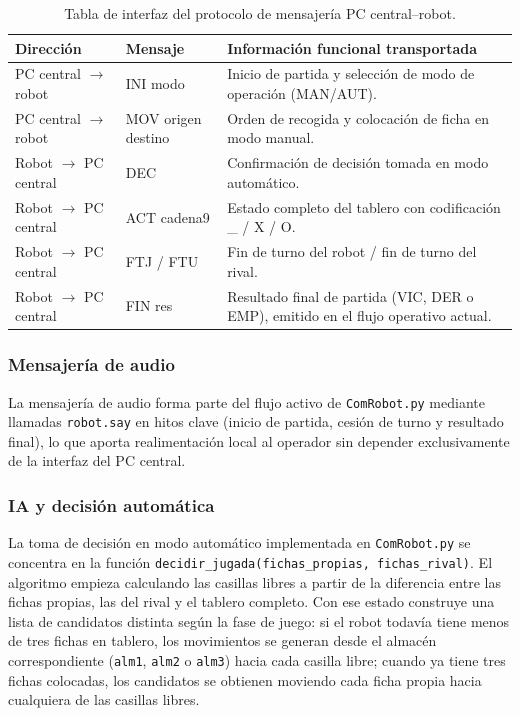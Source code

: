 \documentclass[12pt,a4paper]{article}
\begin{document}
\begin{table}[H]
\centering
\footnotesize
\begin{tabular}{P{0.15\textwidth} P{0.21\textwidth} P{0.56\textwidth}}
\toprule
\textbf{Dirección} & \textbf{Mensaje} & \textbf{Información funcional transportada} \\
\midrule
PC central $\rightarrow$ robot & INI modo & Inicio de partida y selección de modo de operación (MAN/AUT). \\
PC central $\rightarrow$ robot & MOV origen destino & Orden de recogida y colocación de ficha en modo manual. \\
Robot $\rightarrow$ PC central & DEC & Confirmación de decisión tomada en modo automático. \\
Robot $\rightarrow$ PC central & ACT cadena9 & Estado completo del tablero con codificación \_ / X / O. \\
Robot $\rightarrow$ PC central & FTJ / FTU & Fin de turno del robot / fin de turno del rival. \\
Robot $\rightarrow$ PC central & FIN res & Resultado final de partida (VIC, DER o EMP), emitido en el flujo operativo actual. \\
\bottomrule
\end{tabular}
\caption{Tabla de interfaz del protocolo de mensajería PC central--robot.}
\end{table}

\subsubsection{Mensajería de audio}
La mensajería de audio forma parte del flujo activo de \texttt{ComRobot.py} mediante llamadas \texttt{robot.say} en hitos clave (inicio de partida, cesión de turno y resultado final), lo que aporta realimentación local al operador sin depender exclusivamente de la interfaz del PC central.

\subsubsection{IA y decisión automática}
La toma de decisión en modo automático implementada en \texttt{ComRobot.py} se concentra en la función \texttt{decidir\_jugada(fichas\_propias, fichas\_rival)}. El algoritmo empieza calculando las casillas libres a partir de la diferencia entre las fichas propias, las del rival y el tablero completo. Con ese estado construye una lista de candidatos distinta según la fase de juego: si el robot todavía tiene menos de tres fichas en tablero, los movimientos se generan desde el almacén correspondiente (\texttt{alm1}, \texttt{alm2} o \texttt{alm3}) hacia cada casilla libre; cuando ya tiene tres fichas colocadas, los candidatos se obtienen moviendo cada ficha propia hacia cualquiera de las casillas libres.
\end{document}
